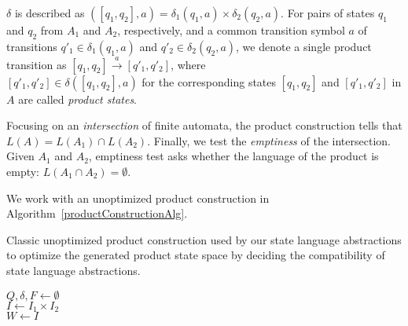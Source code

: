 $\delta$ is described as $([q_1, q_2], a) = \delta_1(q_1, a) \times \delta_2(q_2, a)$. For pairs of states $q_1$ and $q_2$ from $A_1$ and $A_2$, respectively, and a common transition symbol $a$ of transitions $q'_1 \in \delta_1(q_1, a)$ and $q'_2 \in \delta_2(q_2,a)$, we denote a single product transition as $[q_1, q_2] \xrightarrow{a} [q'_1, q'_2]$, where \\ $[q'_1, q'_2] \in \delta([q_1, q_2], a)$ for the corresponding states $[q_1, q_2]$ and $[q'_1, q'_2]$ in $A$ are called \emph{product states}.

Focusing on an \emph{intersection} of finite automata, the product construction tells that \\ $ L(A) = L(A_1) \cap L(A_2) $. Finally, we test the \emph{emptiness} of the intersection. Given $A_1$ and $A_2$, emptiness test asks whether the language of the product is empty: $L(A_1 \cap A_2) = \emptyset$.

We work with an unoptimized product construction in Algorithm~\ref{productConstructionAlg}.

\begin{algorithm}[ht]
\caption{Classic unoptimized product construction used by our state language abstractions to optimize the generated product state space by deciding the compatibility of state language abstractions.}\label{productConstructionAlg}
\DontPrintSemicolon
{}
\BlankLine
$Q, \delta, F \gets \emptyset$ \\
$I \gets I_1 \times I_2$ \\
$W \gets  I$

\end{algorithm}

